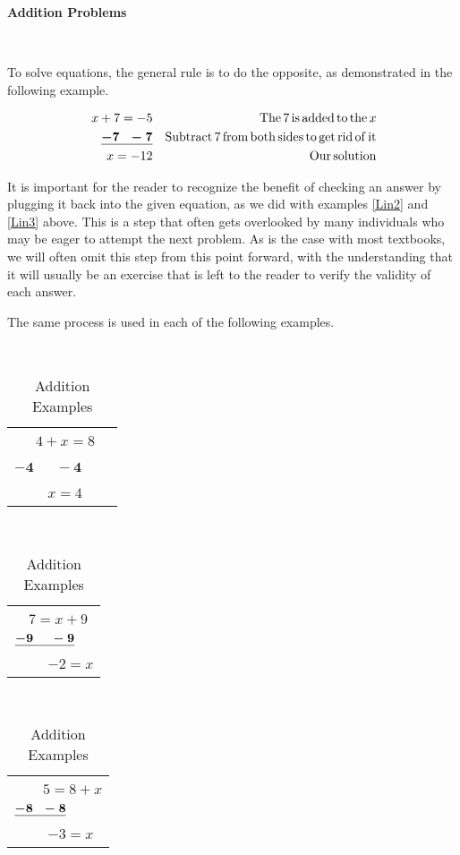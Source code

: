 {\textbf{Addition Problems}}\par
~\par

To solve equations, the general rule is to do the opposite, as demonstrated in the following example.

\begin{example}\label{Lin4}
\begin{eqnarray*}
  x + 7 = - 5 &  & \operatorname{The} 7 \operatorname{is} \operatorname{added} \operatorname{to} \operatorname{the}
  x\\
  ~~~\underline{\boldsymbol{- 7 ~~- 7}} &  & \operatorname{Subtract} 7 \operatorname{from}
  \operatorname{both} \operatorname{sides} \operatorname{to} \operatorname{get} \operatorname{rid} \operatorname{of}
  \operatorname{it}\\
  x = - 12 &  & \operatorname{Our} \operatorname{solution}
\end{eqnarray*}
\end{example}

It is important for the reader to recognize the benefit of checking an answer by plugging it back into the given equation, as we did with examples \ref{Lin2} and \ref{Lin3} above.  This is a step that often gets overlooked by many individuals who may be eager to attempt the next problem.  As is the case with most textbooks, we will often omit this step from this point forward, with the understanding that it will usually be an exercise that is left to the reader to verify the validity of each answer.\pp

The same process is used in each of the following examples.

\pagebreak

\begin{example}\label{Lin5}
~\end{example}

	\begin{table}[h]
		\begin{tabular}{l}
    ~~~$4 + x = 8$\\
    \underline{$\ensuremath{\boldsymbol{- 4 ~~~~~~~- 4}}$}~~~~\\
    ~~~~ $x = 4$
  \end{tabular} \ \ \ \ \ \ \ \ \ \ \ \ \ \ \ \ \ \ \ \begin{tabular}{l}
    \ \ $7 = x + 9$\\
    $\boldsymbol{\underline{- 9 ~~~~- 9}}$\\
    ~~~~ $- 2 = x$
  \end{tabular} \ \ \ \ \ \ \ \ \ \ \ \ \ \ \ \ \ \ \ \begin{tabular}{l}
    \ \ ~~$5 = 8 + x$\\
    $\boldsymbol{\underline{- 8 ~~- 8}}$\\
    ~~~~ $- 3 = x$
  \end{tabular}
  \caption{Addition Examples}
	\end{table}

